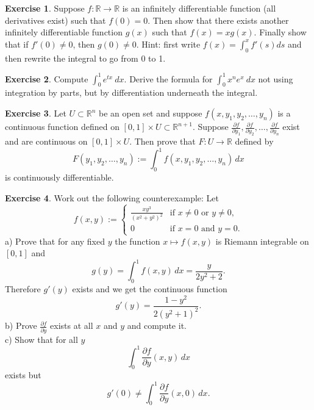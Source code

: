 \documentclass[12pt]{book}
\newcommand{\R}{{\mathbb{R}}}
\theoremstyle{plain}
\theoremstyle{remark}
\theoremstyle{definition}
\theoremstyle{exercise}
\newtheorem{exercise}{Exercise}[section]
\theoremstyle{example}
\begin{document}
\begin{exercise}
Suppose $f \colon \R \to \R$ is an infinitely differentiable function (all derivatives exist)
such that $f(0) = 0$.  Then show that there exists another infinitely
differentiable function $g(x)$ such that $f(x) = xg(x)$.  Finally show that
if $f'(0) \not= 0$, then $g(0) \not= 0$.  Hint: first write
$f(x) = \int_0^x f'(s) ds$ and then rewrite the integral to go from $0$ to
1.
\end{exercise}


\begin{exercise}
Compute $\int_0^1 e^{tx} ~dx$.  Derive the formula for
$\int_0^1 x^n e^{x} ~dx$ not using integration by parts, but
by differentiation underneath the integral.
\end{exercise}

\begin{exercise}
Let $U \subset \R^n$ be an open set and suppose
$f(x,y_1,y_2,\ldots,y_n)$ is a continuous
function defined on $[0,1] \times U \subset \R^{n+1}$.
Suppose
$\frac{\partial f}{\partial y_1},
\frac{\partial f}{\partial y_2},\ldots,
\frac{\partial f}{\partial y_n}$
exist and are continuous on $[0,1] \times U$.
Then prove that $F \colon U \to \R$ defined by
\begin{equation*}
F(y_1,y_2,\ldots,y_n) :=
\int_0^1
f(x,y_1,y_2,\ldots,y_n)
\, dx
\end{equation*}
is continuously differentiable.
\end{exercise}

\begin{exercise}
Work out the following counterexample:  Let
\begin{equation*}
f(x,y) :=
\begin{cases}
\frac{xy^3}{{(x^2+y^2)}^2} & \text{if $x\not=0$ or $y\not= 0$,}\\
0 & \text{if $x=0$ and $y=0$.}
\end{cases}
\end{equation*}
a) Prove that for any fixed $y$ the function $x \mapsto f(x,y)$ is
Riemann integrable on $[0,1]$ and
\begin{equation*}
g(y) = \int_0^1 f(x,y) \, dx = \frac{y}{2y^2+2} .
\end{equation*}
Therefore $g'(y)$ exists and we get the continuous function
\begin{equation*}
g'(y) = \frac{1-y^2}{2{(y^2+1)}^2} .
\end{equation*}
b) Prove $\frac{\partial f}{\partial y}$ exists at all $x$ and $y$ and
compute it.\\
c) Show that for all $y$
\begin{equation*}
\int_0^1 \frac{\partial f}{\partial y} (x,y) \, dx
\end{equation*}
exists but
\begin{equation*}
g'(0) \not= \int_0^1 \frac{\partial f}{\partial y} (x,0) \, dx .
\end{equation*}
\end{exercise}
\end{document}
